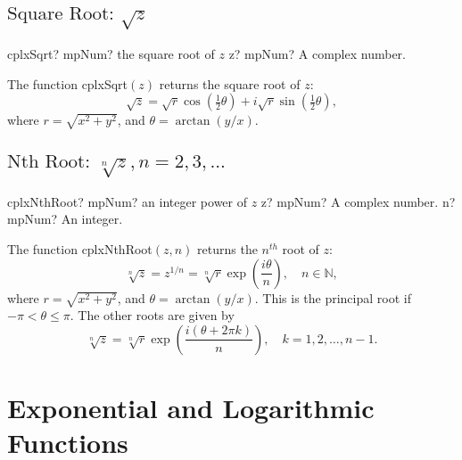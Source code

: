\newpage
\subsection{\texorpdfstring{$\text{Square Root: }\sqrt{z}$}{sqrt}}


\begin{mpFunctionsExtract}
	\mpFunctionOne
	{cplxSqrt? mpNum? the square root of $z$}
	{z? mpNum? A complex number.}
\end{mpFunctionsExtract}

\vspace{0.3cm}
The function \textsf{cplxSqrt$(z)$} returns the square root of $z$: 
\begin{equation}
	\sqrt{z} = \sqrt{r} \cos\left(\tfrac{1}{2}\theta\right) + i  \sqrt{r} \sin\left(\tfrac{1}{2}\theta\right),
\end{equation}
where $r=\sqrt{x^2+y^2}$, and $\theta=\arctan(y/x)$.



\subsection{\texorpdfstring{$\text{Nth Root: }\sqrt[n]{z}, n=2,3,...$}{nthRoot}}


\begin{mpFunctionsExtract}
	\mpFunctionTwo
	{cplxNthRoot? mpNum? an integer power of $z$}
	{z? mpNum? A complex number.}
	{n? mpNum? An integer.}
\end{mpFunctionsExtract}

\vspace{0.3cm}
\vspace{0.3cm}
The function \textsf{cplxNthRoot$(z, n)$} returns the $n^{th}$ root of $z$: 
\begin{equation}
	\sqrt[n]{z} = z^{1/n} = \sqrt[n]{r}  \exp\left(\frac{i \theta}{n}\right), \quad  n \in  \mathbb{N},
\end{equation}
where $r=\sqrt{x^2+y^2}$, and $\theta=\arctan(y/x)$. This is the principal root if $-\pi<\theta \leq \pi$.
The other roots are given by
\begin{equation}
	\sqrt[n]{z} = \sqrt[n]{r}  \exp\left(\frac{i (\theta+2\pi k)}{n}\right) , \quad  k=1, 2, \ldots, n-1.
\end{equation}









\section{Exponential and Logarithmic Functions}
\label{ExponentialAndLogarithmCplx}


